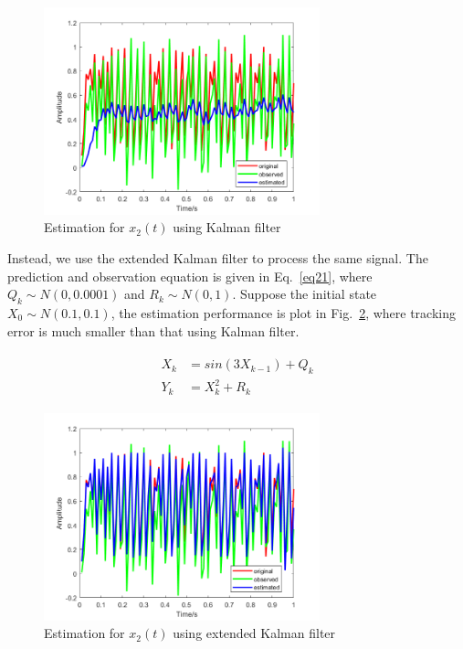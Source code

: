 \documentclass[conference]{IEEEtran}
\begin{document}
	\begin{figure}[H]
		\centering
		\includegraphics[width=8cm]{fig3.png}
		\caption{Estimation for $x_{2}(t)$ using Kalman filter}
		\label{fig3}
	\end{figure}

	Instead, we use the extended Kalman filter to process the same signal. The prediction and observation equation is given in Eq.~\ref{eq21}, where $Q_{k}\sim N(0,0.0001)$ and $R_{k}\sim N(0,1)$. Suppose the initial state $X_{0}\sim N(0.1,0.1)$, the estimation performance is plot in Fig.~\ref{fig4}, where tracking error is much smaller than that using Kalman filter.
	
	\begin{equation}
	\begin{split}
	\begin{aligned}
	X_{k}&=sin(3X_{k-1})+Q_{k}\\
	Y_{k}&=X_{k}^{2}+R_{k}
	\label{eq21}
	\end{aligned}
	\end{split}
	\end{equation}
	
	\begin{figure}[h]
		\centering
		\includegraphics[width=8cm]{fig4.png}
		\caption{Estimation for $x_{2}(t)$ using extended Kalman filter}
		\label{fig4}
	\end{figure}
\end{document}
